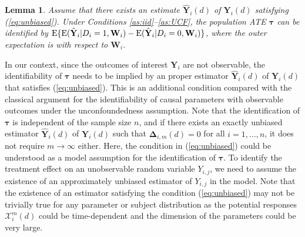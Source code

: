 \documentclass[12pt]{article}
\newtheorem{lemma}{Lemma}
\theoremstyle{definition}
\newcommand{\E}{\rm E}
\newcommand{\bT}{{\mathbf T}}
\newcommand{\bW}{{\mathbf W}}
\newcommand{\bY}{{\mathbf Y}}
\newcommand{\bDelta}{\boldsymbol{\Delta}}
\newcommand{\btau}{\boldsymbol{\tau}}
\begin{document}
\begin{lemma}\label{lm:1}
Assume that there exists an estimate $\hat{\bY}_{i}(d)$ of $\bY_{i}(d)$ satisfying (\ref{eq:unbiased}).
Under Conditions \ref{as:iid}--\ref{as:UCF}, the population ATE $\btau$ can be identified by ${\E}\{{\E}(\hat{\bY}_{i} | D_i = 1, \bW_i) - {\E}(\hat{\bY}_{i} | D_i = 0, \bW_i)\}$, 
where the outer expectation is with respect to $\bW_i$.
\end{lemma}

In our context, since the outcomes of interest $\bY_i$ are not observable, 
the identifiability of $\btau$ needs to be implied by an proper estimator $\hat{\bY}_i(d)$ of $\bY_i(d)$ that satisfies (\ref{eq:unbiased}).
This is an additional condition compared with the classical argument for the identifiability of causal parameters with observable outcomes under the unconfoundedness assumption. 
Note that the identification of $\btau$ is independent of the sample size $n$, and
if there exists an exactly unbiased estimator $\hat{\bY}_{i}(d)$ of $\bY_i(d)$ such that $\bDelta_{i, m}(d) = 0$ for all $i = 1, \ldots, n$, it does not require $m \to \infty$ either.
Here, the condition in (\ref{eq:unbiased}) could be understood as a model assumption for the identification of $\btau$. 
To identify the treatment effect on an unobservable random variable $Y_{i, j}$, we need to assume the existence of an approximately unbiased estimator of $Y_{i, j}$ in the model. 
Note that the existence of an estimator satisfying the condition (\ref{eq:unbiased}) may not be trivially true for any parameter or subject distribution as the potential responses $\mathcal{X}_i^m(d)$ could be time-dependent and the dimension of the parameters could be very large.
\end{document}
